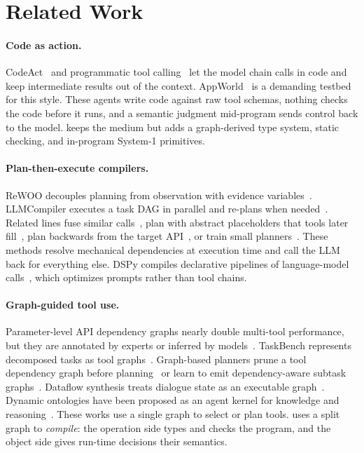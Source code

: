 \section{Related Work}
\label{sec:related}

\paragraph{Code as action.} CodeAct~\cite{wang2024codeact} and programmatic tool calling~\cite{anthropic2025advancedtooluse} let the model chain calls in code and keep intermediate results out of the context. AppWorld~\cite{trivedi2024appworld} is a demanding testbed for this style. These agents write code against raw tool schemas, nothing checks the code before it runs, and a semantic judgment mid-program sends control back to the model. \jif keeps the medium but adds a graph-derived type system, static checking, and in-program System-1 primitives.

\paragraph{Plan-then-execute compilers.} ReWOO decouples planning from observation with evidence variables~\cite{xu2023rewoo}. LLMCompiler executes a task DAG in parallel and re-plans when needed~\cite{kim2024llmcompiler}. Related lines fuse similar calls~\cite{singh2024llmtoolcompiler}, plan with abstract placeholders that tools later fill~\cite{gao2024coa}, plan backwards from the target API~\cite{zhang2024reversechain}, or train small planners~\cite{erdogan2024tinyagent}. These methods resolve mechanical dependencies at execution time and call the LLM back for everything else. DSPy compiles declarative pipelines of language-model calls~\cite{khattab2024dspy}, which optimizes prompts rather than tool chains.

\paragraph{Graph-guided tool use.} Parameter-level API dependency graphs nearly double multi-tool performance, but they are annotated by experts or inferred by models~\cite{lee2026innout}. TaskBench represents decomposed tasks as tool graphs~\cite{shen2024taskbench}. Graph-based planners prune a tool dependency graph before planning~\cite{navi2025} or learn to emit dependency-aware subtask graphs~\cite{gap2025}. Dataflow synthesis treats dialogue state as an executable graph~\cite{andreas2020dataflow}. Dynamic ontologies have been proposed as an agent kernel for knowledge and reasoning~\cite{zhang2026oak}. These works use a single graph to select or plan tools. \jif uses a split graph to \emph{compile}: the operation side types and checks the program, and the object side gives run-time decisions their semantics.

